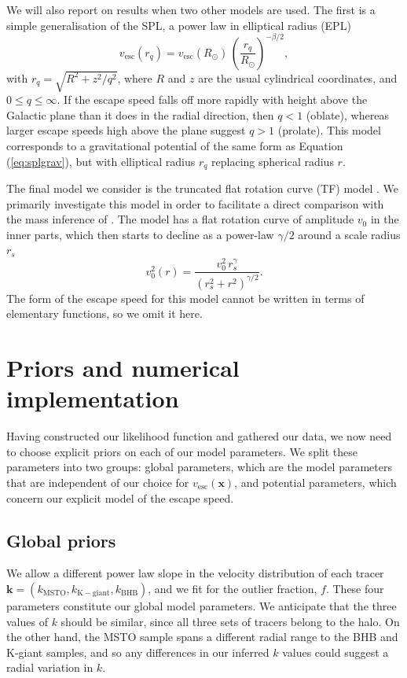 \documentclass[useAMS,twocolumn,usenatbib]{mn2e}
\def\vesc{{v_\mathrm{esc}}}
\def\pos{{\boldsymbol{x}}}
\begin{document}
We will also report on results when two other models are used. 
The first is a simple generalisation of the SPL, a power law in elliptical radius (EPL)
%
\begin{equation}
\vesc(r_q) = \vesc(R_\odot)\,\left(\dfrac{r_q}{R_\odot}\right)^{-\beta/2},
\end{equation}
%
with $r_q = \sqrt{R^2 + z^2/q^2}$, where $R$ and $z$ are the usual cylindrical coordinates, and $0 \leq q \leq \infty$. 
If the escape speed falls off more rapidly with height above the Galactic plane than it does in the radial direction, then $q<1$ (oblate), whereas larger escape speeds high above the plane suggest $q>1$ (prolate). 
This model corresponds to a gravitational potential of the same form as Equation (\ref{eq:splgrav}), but with elliptical radius $r_q$ replacing spherical radius $r$.

The final model we consider is the truncated flat rotation curve (TF) model \citep[see][]{Gi14,Wi99}. 
We primarily investigate this model in order to facilitate a direct comparison with the mass inference of \citet{Gi14}.
The model has a flat rotation curve of amplitude $v_0$ in the inner parts, which then starts to decline as a power-law $\gamma/2$ around a scale radius $r_s$
%
\begin{equation}
v_0^2(r) = \dfrac{v_0^2\,r_s^\gamma}{(r_s^2 + r^2)^{\gamma/2}}.
\end{equation}
%
The form of the escape speed for this model cannot be written in terms of elementary functions, so we omit it here.

\section{Priors and numerical implementation}

\label{sec:pannm}

Having constructed our likelihood function and gathered our data, we now need to choose explicit priors on each of our model parameters. 
We split these parameters into two groups: global parameters, which are the model parameters that are independent of our choice for $\vesc(\pos)$, and potential parameters, which concern our explicit model of the escape speed.

\subsection{Global priors}
We allow a different power law slope in the velocity distribution of each tracer $\boldsymbol{k} = (k_\mathrm{MSTO},k_\mathrm{K-giant},k_\mathrm{BHB})$, and we fit for the outlier fraction, $f$.
These four parameters constitute our global model parameters. 
We anticipate that the three values of $k$ should be similar, since all three sets of tracers belong to the halo.
On the other hand, the MSTO sample spans a different radial range to the BHB and K-giant samples, and so any differences in our inferred $k$ values could suggest a radial variation in $k$.
\end{document}
